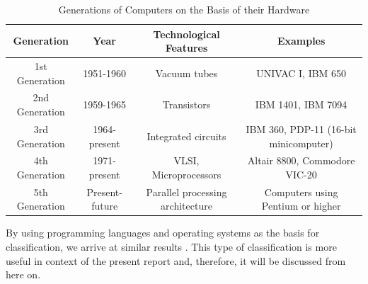 \begin{table}[H]
\caption{Generations of Computers on the Basis of their Hardware}\label{table:compgen1}
\begin{center}
\begin{adjustbox}{width=1.0\textwidth,center=\textwidth}
\begin{tabular}{|c|c|c|c|}
\hline
\textbf{Generation} & \textbf{Year} & \textbf{Technological Features} & \textbf{Examples}\\
\hline
1st Generation & 1951-1960 & Vacuum tubes & UNIVAC I, IBM 650\\
\hline
2nd Generation & 1959-1965 & Transistors & IBM 1401, IBM 7094\\
\hline
3rd Generation & 1964-present & Integrated circuits & IBM 360, PDP-11 (16-bit minicomputer)\\
\hline
4th Generation & 1971-present & VLSI, Microprocessors & Altair 8800, Commodore VIC-20\\
\hline
5th Generation & Present-future & Parallel processing architecture & Computers using Pentium or higher\\
\hline
\end{tabular}
\end{adjustbox}
\end{center}
\end{table}
By using programming languages and operating systems as the basis for classification, we arrive at similar results \cite{tannenbaum2003operating}. This type of classification is more useful in context of the present report and, therefore, it will be discussed from here on.

